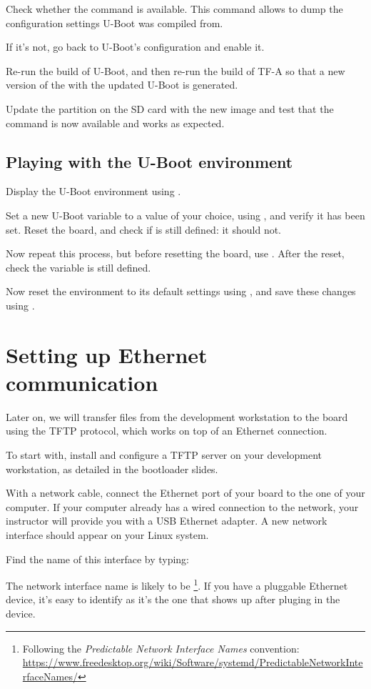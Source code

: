 Check whether the  command is available. This command
allows to dump the configuration settings U-Boot was compiled from.

If it's not, go back to U-Boot's configuration and enable it.

Re-run the build of U-Boot, and then re-run the build of TF-A so that
a new version of the  with the updated U-Boot is
generated.

Update the  partition on the SD card with the new
 image and test that the command is now available and
works as expected.

\subsection{Playing with the U-Boot environment}

Display the U-Boot environment using .

Set a new U-Boot variable  to a value of your choice, using
, and verify it has been set. Reset the board, and check
if  is still defined: it should not.

Now repeat this process, but before resetting the board, use
. After the reset, check the  variable is
still defined.

Now reset the environment to its default settings using , and save these changes using .

\section{Setting up Ethernet communication}

Later on, we will transfer files from the development workstation to
the board using the TFTP protocol, which works on top of an Ethernet
connection.

To start with, install and configure a TFTP server on your development
workstation, as detailed in the bootloader slides.

With a network cable, connect the Ethernet port of
your board to the one of your computer. If your computer already has a
wired connection to the network, your instructor will provide you with
a USB Ethernet adapter. A new network interface should appear on your
Linux system.

Find the name of this interface by typing:

The network interface name is likely to be
\footnote{Following the {\em Predictable Network Interface
Names} convention:
\url{https://www.freedesktop.org/wiki/Software/systemd/PredictableNetworkInterfaceNames/}}.
If you have a pluggable Ethernet device, it's easy to identify as it's
the one that shows up after pluging in the device.

